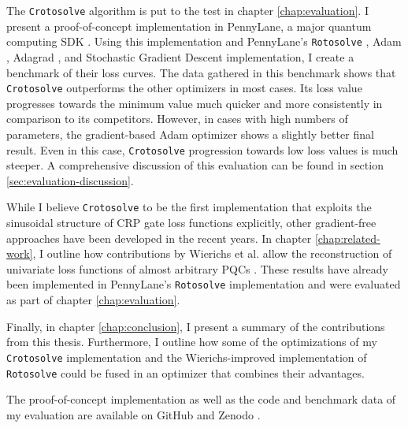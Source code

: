 The \texttt{Crotosolve} algorithm is put to the test in chapter
\ref{chap:evaluation}.
I present a proof-of-concept implementation in PennyLane, a major quantum
computing SDK \cite{bergholm_pennylane_2018,unitary_fund_team_results_2022}.
Using this implementation and PennyLane's
\texttt{Rotosolve} \cite{ostaszewski_structure_2021},
Adam \cite{kingma_adam_2017},
Adagrad \cite{duchi_adaptive_2011}, and
Stochastic Gradient Descent implementation, I create a benchmark of their loss
curves.
The data gathered in this benchmark shows that \texttt{Crotosolve} outperforms
the other optimizers in most cases.
Its loss value progresses towards the minimum value much quicker and more
consistently in comparison to its competitors.
However, in cases with high numbers of parameters, the gradient-based Adam
optimizer shows a slightly better final result.
Even in this case, \texttt{Crotosolve} progression towards low loss values is
much steeper. 
A comprehensive discussion of this evaluation can be found in section
\ref{sec:evaluation-discussion}.

While I believe \texttt{Crotosolve} to be the first implementation that exploits
the sinusoidal structure of CRP gate loss functions explicitly, other
gradient-free approaches have been developed in the recent years.
In chapter \ref{chap:related-work}, I outline how contributions by
Wierichs et al. allow the reconstruction of univariate loss functions of almost
arbitrary PQCs \cite{wierichs_general_2022}.
These results have already been implemented in PennyLane's \texttt{Rotosolve}
implementation and were evaluated as part of chapter \ref{chap:evaluation}.

Finally, in chapter \ref{chap:conclusion}, I present a summary of the
contributions from this thesis.
Furthermore, I outline how some of the optimizations of my \texttt{Crotosolve}
implementation and the Wierichs-improved implementation of \texttt{Rotosolve}
could be fused in an optimizer that combines their advantages.

The proof-of-concept implementation as well as the code and benchmark data of my
evaluation are available on GitHub and Zenodo
\cite{schweikart_schweikartcrotosolve_2023}.

